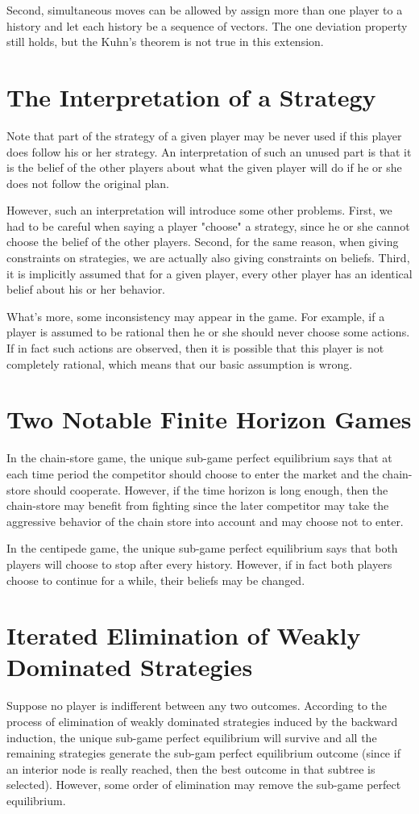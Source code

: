 \documentclass[openany]{book}
\begin{document}
Second, simultaneous moves can be allowed by assign more than one player to a history and let each history be a sequence of vectors. The one deviation property still holds, but the Kuhn's theorem is not true in this extension.

\section{The Interpretation of a Strategy}
Note that part of the strategy of a given player may be never used if this player does follow his or her strategy. An interpretation of such an unused part is that it is the belief of the other players about what the given player will do if he or she does not follow the original plan.

However, such an interpretation will introduce some other problems. First, we had to be careful when saying a player "choose" a strategy, since he or she cannot choose the belief of the other players. Second, for the same reason, when giving constraints on strategies, we are actually also giving constraints on beliefs. Third, it is implicitly assumed that for a given player, every other player has an identical belief about his or her behavior.

What's more, some inconsistency may appear in the game. For example, if a player is assumed to be rational then he or she should never choose some actions. If in fact such actions are observed, then it is possible that this player is not completely rational, which means that our basic assumption is wrong.

\section{Two Notable Finite Horizon Games}
In the chain-store game, the unique sub-game perfect equilibrium says that at each time period the competitor should choose to enter the market and the chain-store should cooperate. However, if the time horizon is long enough, then the chain-store may benefit from fighting since the later competitor may take the aggressive behavior of the chain store into account and may choose not to enter.

In the centipede game, the unique sub-game perfect equilibrium says that both players will choose to stop after every history. However, if in fact both players choose to continue for a while, their beliefs may be changed.

\section{Iterated Elimination of Weakly Dominated Strategies}
Suppose no player is indifferent between any two outcomes. According to the process of elimination of weakly dominated strategies induced by the backward induction, the unique sub-game perfect equilibrium will survive and all the remaining strategies generate the sub-gam perfect equilibrium outcome (since if an interior node is really reached, then the best outcome in that subtree is selected). However, some order of elimination may remove the sub-game perfect equilibrium.
\end{document}
